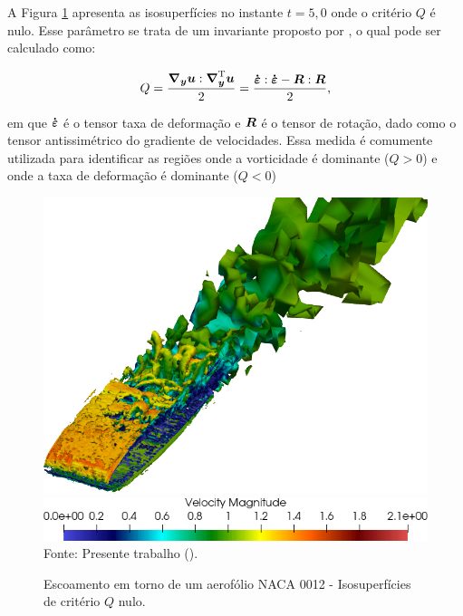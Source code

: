 A Figura \ref{fig:NACA0012-QCriterion} apresenta as isosuperfícies no instante $t=5,0$ onde o critério $Q$ é nulo. Esse parâmetro se trata de um invariante proposto por , o qual pode ser calculado como:

\begin{equation}
    Q=\frac{\boldsymbol{\nabla_y}\boldsymbol{u}:\boldsymbol{\nabla}^{\mathrm{T}}_{\boldsymbol{y}}\boldsymbol{u}}{2}=\frac{\boldsymbol{\dot{\boldsymbol{\varepsilon}}}:\boldsymbol{\dot{\boldsymbol{\varepsilon}}}-\boldsymbol{R}:\boldsymbol{R}}{2}\text{,}
\end{equation}

\noindent em que $\boldsymbol{\dot{\boldsymbol{\varepsilon}}}$ é o tensor taxa de deformação e $\boldsymbol{R}$ é o tensor de rotação, dado como o tensor antissimétrico do gradiente de velocidades. Essa medida é comumente utilizada para identificar as regiões onde a vorticidade é dominante ($Q>0$) e onde a taxa de deformação é dominante ($Q<0$) \cite{hunt1988eddies,piomelli2000large}

\begin{figure}[h!]
    \centering
    \caption{Escoamento em torno de um aerofólio NACA 0012 - Isosuperfícies de critério $Q$ nulo.}
    \includegraphics[width=.7\linewidth]{Figuras/NACA0012/QCriterion-500.png}
    \includegraphics[width=.5\linewidth]{Figuras/NACA0012/QCriterion-colormap-500.png}
    \\Fonte: Presente trabalho (\the\year).
    \label{fig:NACA0012-QCriterion}
\end{figure}


